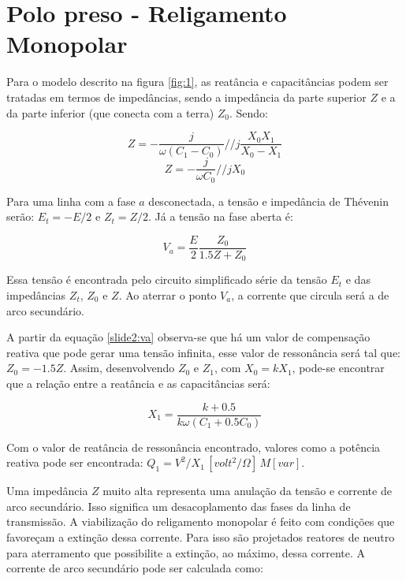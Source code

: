 \section{Polo preso - Religamento Monopolar}

Para o modelo descrito na figura \ref{fig:1}, as reatância e capacitâncias podem ser tratadas em termos de impedâncias, sendo a impedância da parte superior $Z$ e a da parte inferior (que conecta com a terra) $Z_0$. Sendo:

\begin{equation} \label{slide2:z1}
    Z = -\frac{j}{\omega(C_1-C_0)} // j\frac{X_0X_1}{X_0-X_1}
\end{equation}
\begin{equation} \label{slide2:z0}
    Z = -\frac{j}{\omega C_0} // jX_0
\end{equation}

Para uma linha com a fase $a$ desconectada, a tensão e impedância de Thévenin serão: $E_t = -E/2$ e $Z_t = Z/2$. Já a tensão na fase aberta é:

\begin{equation} \label{slide2:va}
    V_a = \frac{E}{2}\frac{Z_0}{1.5Z+Z_0}
\end{equation}

Essa tensão é encontrada pelo circuito simplificado série da tensão $E_t$ e das impedâncias $Z_t$, $Z_0$ e $Z$. Ao aterrar o ponto $V_a$, a corrente que circula será a de arco secundário.

A partir da equação \ref{slide2:va} observa-se que há um valor de compensação reativa que pode gerar uma tensão infinita, esse valor de ressonância será tal que: $Z_0 = -1.5Z$. Assim, desenvolvendo $Z_0$ e $Z_1$, com $X_0=kX_1$, pode-se encontrar que a relação entre a reatância e as capacitâncias será:

 \begin{equation} \label{slide2:x1}
    X_1 = \frac{k+0.5}{k\omega (C_1 +0.5C_0)}
\end{equation}

Com o valor de reatância de ressonância encontrado, valores como a potência reativa pode ser encontrada: $Q_1 = V^2/X_1 \, [volt^2/\Omega] \, M[var]$. 

Uma impedância $Z$ muito alta representa uma anulação da tensão e corrente de arco secundário. Isso significa um desacoplamento das fases da linha de transmissão. A viabilização do religamento monopolar é feito com condições que favoreçam a extinção dessa corrente. Para isso são projetados reatores de neutro para aterramento que possibilite a extinção, ao máximo, dessa corrente. A corrente de arco secundário pode ser calculada como:

